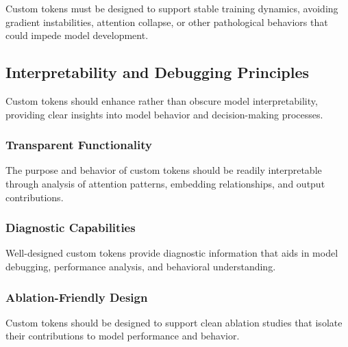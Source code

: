 Custom tokens must be designed to support stable training dynamics, avoiding gradient instabilities, attention collapse, or other pathological behaviors that could impede model development.

\subsection{Interpretability and Debugging Principles}

Custom tokens should enhance rather than obscure model interpretability, providing clear insights into model behavior and decision-making processes.

\subsubsection{Transparent Functionality}

The purpose and behavior of custom tokens should be readily interpretable through analysis of attention patterns, embedding relationships, and output contributions.

\subsubsection{Diagnostic Capabilities}

Well-designed custom tokens provide diagnostic information that aids in model debugging, performance analysis, and behavioral understanding.
\begin{comment}
Feedback: This is a great point. An example would make it more concrete. "For instance, if you design a `<TOOL_USE>` token, you can analyze its attention patterns to see exactly which parts of the input text the model considered relevant when it decided to call a specific tool. This provides a powerful debugging and interpretability signal."
\end{comment}

\subsubsection{Ablation-Friendly Design}

Custom tokens should be designed to support clean ablation studies that isolate their contributions to model performance and behavior.

